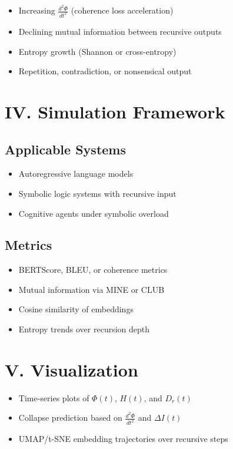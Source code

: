 \documentclass[12pt]{article}
\begin{document}
\begin{itemize}
  \item Increasing $\frac{d^2 \Phi}{dt^2}$ (coherence loss acceleration)
  \item Declining mutual information between recursive outputs
  \item Entropy growth (Shannon or cross-entropy)
  \item Repetition, contradiction, or nonsensical output
\end{itemize}

\section*{IV. Simulation Framework}

\subsection*{Applicable Systems}

\begin{itemize}
  \item Autoregressive language models
  \item Symbolic logic systems with recursive input
  \item Cognitive agents under symbolic overload
\end{itemize}

\subsection*{Metrics}

\begin{itemize}
  \item BERTScore, BLEU, or coherence metrics
  \item Mutual information via MINE or CLUB
  \item Cosine similarity of embeddings
  \item Entropy trends over recursion depth
\end{itemize}

\section*{V. Visualization}

\begin{itemize}
  \item Time-series plots of $\Phi(t)$, $H(t)$, and $D_r(t)$
  \item Collapse prediction based on $\frac{d^2 \Phi}{dt^2}$ and $\Delta I(t)$
  \item UMAP/t-SNE embedding trajectories over recursive steps
\end{itemize}
\end{document}
